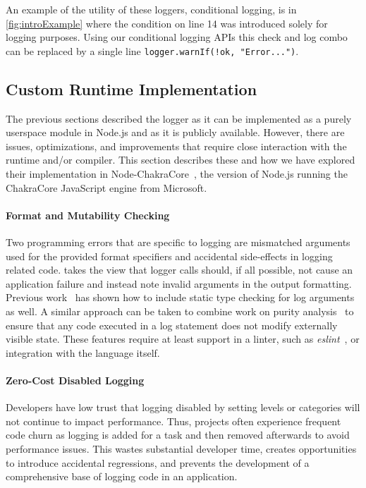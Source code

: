 An example of the utility of these loggers, conditional logging, is in
\autoref{fig:introExample} where the condition on line 14 was introduced 
solely for logging purposes. Using our conditional logging APIs this check 
and log combo can be replaced by a single line \lstinline{logger.warnIf(!ok, "Error...")}.

\subsection{Custom Runtime Implementation}
\label{sec:runtimesupport}
The previous sections described the \projn logger as it can be implemented as a purely 
userspace module in Node.js and as it is publicly available. However, there are 
issues, optimizations, and improvements that require close interaction with the 
runtime and/or compiler. This section describes these and how we have explored their 
implementation in Node-ChakraCore~\cite{NodeChakraCore}, the version of Node.js running the ChakraCore 
JavaScript engine from Microsoft. 

\paragraph{Format and Mutability Checking}
\noindent
Two programming errors that are specific to logging are mismatched arguments used 
for the provided format specifiers and accidental side-effects in logging related 
code. \projn takes the view that logger calls should, if all possible, not cause 
an application failure and instead note invalid arguments in the output formatting. 
Previous work~\cite{tyepcheckprintf} has shown how to include static type 
checking for log arguments as well. A similar approach can be taken to combine 
work on purity analysis~\cite{choipurity,mypurity} to ensure that any code executed 
in a log statement does not modify externally visible state. These features require 
at least support in a linter, such as \emph{eslint}~\cite{eslint}, or integration 
with the language itself.

\paragraph{Zero-Cost Disabled Logging}
\noindent
Developers have low trust that logging disabled by setting levels or categories 
will not continue to impact performance. Thus, projects often experience frequent 
code churn as logging is added for a task and then removed afterwards to avoid 
performance issues. This wastes substantial developer time, creates opportunities 
to introduce accidental regressions, and prevents the development of a comprehensive 
base of logging code in an application. 

